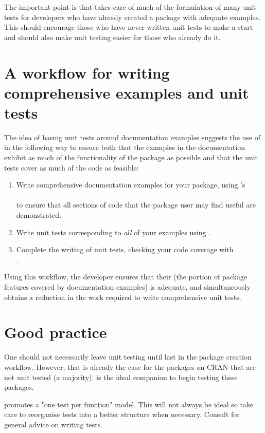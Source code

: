 The important point is that  takes care of much of the formulation of many unit tests for developers who have already created a package with adequate examples. This should encourage those who have never written unit tests to make a start and should also make unit testing easier for those who already do it.

\section{A workflow for writing comprehensive examples and unit tests}
The idea of basing unit tests around documentation examples suggests the use of  \citep{covr} in the following way to ensure both that the examples in the documentation exhibit as much of the functionality of the package as possible and that the unit tests cover as much of the code as feasible:
\begin{enumerate}
	\item Write comprehensive documentation examples for your package, using 's\\
	 \\
	to ensure that all sections of code that the package user may find useful are demonstrated.
	\item Write unit tests corresponding to \emph{all} of your examples using .
	\item Complete the writing of unit tests, checking your code coverage with \\ .
\end{enumerate}
Using this workflow, the developer ensures that their  (the portion of package features covered by documentation examples) is adequate, and simultaneously obtains a reduction in the work required to write comprehensive unit tests.

\section{Good practice}
One should not necessarily leave unit testing until last in the package creation workflow. However, that is already the case for the packages on CRAN that are not unit tested (a majority).  is the ideal companion to begin testing these packages.

 promotes a "one test per function" model. This will not always be ideal so take care to reorganise tests into a better structure when necessary. Consult \citet{r-pkgs} for general advice on writing tests.

